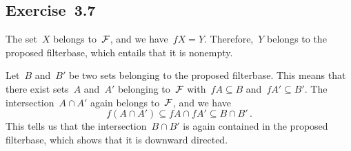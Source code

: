 \subsection{Exercise~3.7}

The set~$X$ belongs to~$\mathcal{F}$, and we have~$f X = Y$.
Therefore,~$Y$ belongs to the proposed filterbase, which entails that it is nonempty.

Let~$B$ and~$B'$ be two sets belonging to the proposed filterbase.
This means that there exist sets~$A$ and~$A'$ belonging to~$\mathcal{F}$ with~$f A ⊆ B$ and~$f A' ⊆ B'$.
The intersection~$A ∩ A'$ again belongs to~$\mathcal{F}$, and we have
\[
	f (A ∩ A')
	⊆
	f A ∩ f A'
	⊆
	B ∩ B' \,.
\]
This tells us that the intersection~$B ∩ B'$ is again contained in the proposed filterbase, which shows that it is downward directed.
